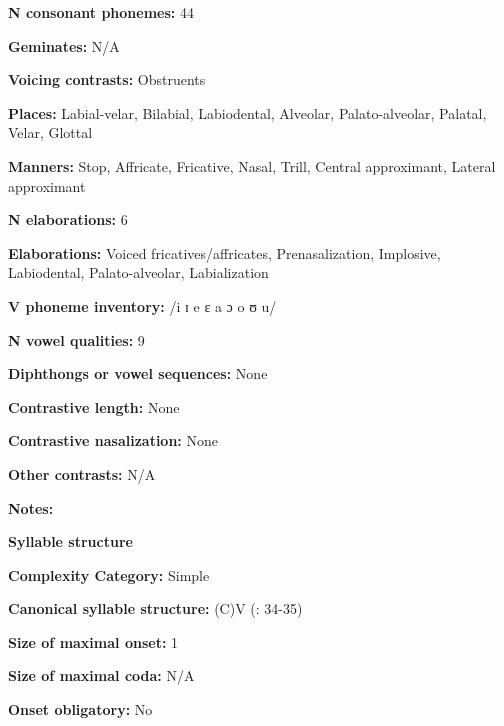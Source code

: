 \textbf{N consonant phonemes:} 44



\textbf{Geminates:} N/A



\textbf{Voicing contrasts:} Obstruents



\textbf{Places:} Labial-velar, Bilabial, Labiodental, Alveolar, Palato-alveolar, Palatal, Velar, Glottal



\textbf{Manners:} Stop, Affricate, Fricative, Nasal, Trill, Central approximant, Lateral approximant



\textbf{N elaborations:} 6



\textbf{Elaborations:} Voiced fricatives/affricates, Prenasalization, Implosive, Labiodental, Palato-alveolar, Labialization



\textbf{V phoneme inventory:} /i ɪ e ɛ a ɔ o ʊ u/



\textbf{N vowel qualities:} 9



\textbf{Diphthongs or vowel sequences:} None



\textbf{Contrastive length:} None



\textbf{Contrastive nasalization:} None



\textbf{Other contrasts:} N/A



\textbf{Notes:}



\textbf{Syllable structure}



\textbf{Complexity Category:} Simple



\textbf{Canonical syllable structure:} (C)V (\citealt{BlackingsFabb2003}: 34-35)



\textbf{Size of maximal onset:} 1



\textbf{Size of maximal coda:} N/A



\textbf{Onset obligatory:} No



